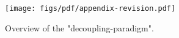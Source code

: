 \begin{figure}[h]
\vspace{-3mm}
\begin{center}
   \texttt{[image: figs/pdf/appendix-revision.pdf]}
\end{center}
\vspace{-3mm}
   \caption{
    Overview of the "decoupling-paradigm".
   }
\label{fig:revision}
\end{figure}
